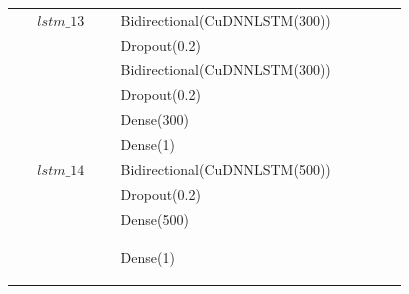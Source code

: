 \begin{longtable}{| c | m{0.58\linewidth} | r | m{0.1\linewidth} |}
    $lstm\_13$  & Bidirectional(CuDNNLSTM(300)) \\
                & Dropout(0.2)                  \\
                & Bidirectional(CuDNNLSTM(300)) \\
                & Dropout(0.2)                  \\
                & Dense(300)                    \\
                & Dense(1)                      \\ \hline

    $lstm\_14$  & Bidirectional(CuDNNLSTM(500)) \\
                & Dropout(0.2)                  \\
                & Dense(500)                    \\
                & Dense(1)                      %

    \label{table:sieci}
\end{longtable}



